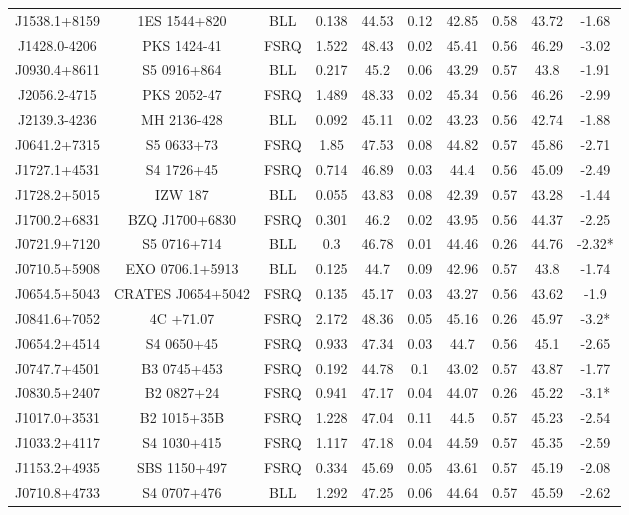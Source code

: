 \documentclass[12pt]{article}
\begin{document}
\begin{landscape}
\begin{longtable}{cccccccccc}
J1538.1+8159 & 1ES 1544+820 & BLL & 0.138 & 44.53 & 0.12 & 42.85 & 0.58 & 43.72 & -1.68 \\
J1428.0-4206 & PKS 1424-41 & FSRQ & 1.522 & 48.43 & 0.02 & 45.41 & 0.56 & 46.29 & -3.02 \\
J0930.4+8611 & S5 0916+864 & BLL & 0.217 & 45.2 & 0.06 & 43.29 & 0.57 & 43.8 & -1.91 \\
J2056.2-4715 & PKS 2052-47 & FSRQ & 1.489 & 48.33 & 0.02 & 45.34 & 0.56 & 46.26 & -2.99 \\
J2139.3-4236 & MH 2136-428 & BLL & 0.092 & 45.11 & 0.02 & 43.23 & 0.56 & 42.74 & -1.88 \\
J0641.2+7315 & S5 0633+73 & FSRQ & 1.85 & 47.53 & 0.08 & 44.82 & 0.57 & 45.86 & -2.71 \\
J1727.1+4531 & S4 1726+45 & FSRQ & 0.714 & 46.89 & 0.03 & 44.4 & 0.56 & 45.09 & -2.49 \\
J1728.2+5015 & IZW 187 & BLL & 0.055 & 43.83 & 0.08 & 42.39 & 0.57 & 43.28 & -1.44 \\
J1700.2+6831 & BZQ J1700+6830 & FSRQ & 0.301 & 46.2 & 0.02 & 43.95 & 0.56 & 44.37 & -2.25 \\
J0721.9+7120 & S5 0716+714 & BLL & 0.3 & 46.78 & 0.01 & 44.46 & 0.26 & 44.76 & -2.32* \\
J0710.5+5908 & EXO 0706.1+5913 & BLL & 0.125 & 44.7 & 0.09 & 42.96 & 0.57 & 43.8 & -1.74 \\
J0654.5+5043 & CRATES J0654+5042 & FSRQ & 0.135 & 45.17 & 0.03 & 43.27 & 0.56 & 43.62 & -1.9 \\
J0841.6+7052 & 4C +71.07 & FSRQ & 2.172 & 48.36 & 0.05 & 45.16 & 0.26 & 45.97 & -3.2* \\
J0654.2+4514 & S4 0650+45 & FSRQ & 0.933 & 47.34 & 0.03 & 44.7 & 0.56 & 45.1 & -2.65 \\
J0747.7+4501 & B3 0745+453 & FSRQ & 0.192 & 44.78 & 0.1 & 43.02 & 0.57 & 43.87 & -1.77 \\
J0830.5+2407 & B2 0827+24 & FSRQ & 0.941 & 47.17 & 0.04 & 44.07 & 0.26 & 45.22 & -3.1* \\
J1017.0+3531 & B2 1015+35B & FSRQ & 1.228 & 47.04 & 0.11 & 44.5 & 0.57 & 45.23 & -2.54 \\
J1033.2+4117 & S4 1030+415 & FSRQ & 1.117 & 47.18 & 0.04 & 44.59 & 0.57 & 45.35 & -2.59 \\
J1153.2+4935 & SBS 1150+497 & FSRQ & 0.334 & 45.69 & 0.05 & 43.61 & 0.57 & 45.19 & -2.08 \\
J0710.8+4733 & S4 0707+476 & BLL & 1.292 & 47.25 & 0.06 & 44.64 & 0.57 & 45.59 & -2.62 \\

\end{longtable}
\end{landscape}
\end{document}
